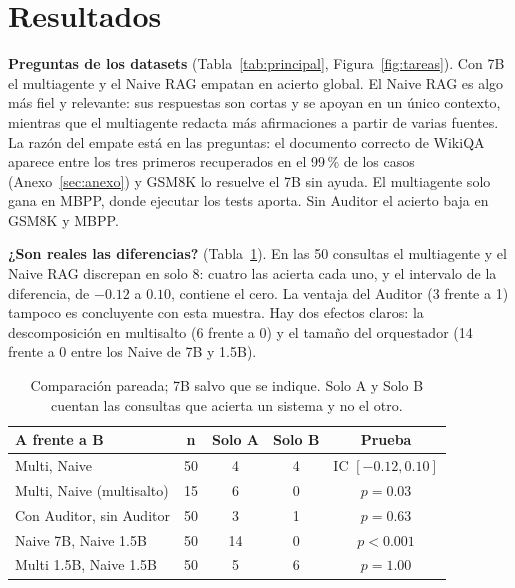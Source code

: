 \documentclass[10pt,a4paper,twocolumn]{article}
\begin{document}
\section{Resultados}

\textbf{Preguntas de los datasets} (Tabla~\ref{tab:principal}, Figura~\ref{fig:tareas}). Con 7B el multiagente y el Naive RAG empatan en acierto global. El Naive RAG es algo más fiel y relevante: sus respuestas son cortas y se apoyan en un único contexto, mientras que el multiagente redacta más afirmaciones a partir de varias fuentes. La razón del empate está en las preguntas: el documento correcto de WikiQA aparece entre los tres primeros recuperados en el 99\,\% de los casos (Anexo~\ref{sec:anexo}) y GSM8K lo resuelve el 7B sin ayuda. El multiagente solo gana en MBPP, donde ejecutar los tests aporta. Sin Auditor el acierto baja en GSM8K y MBPP.

\textbf{¿Son reales las diferencias?} (Tabla~\ref{tab:pares}). En las 50 consultas el multiagente y el Naive RAG discrepan en solo 8: cuatro las acierta cada uno, y el intervalo de la diferencia, de $-0.12$ a $0.10$, contiene el cero. La ventaja del Auditor (3 frente a 1) tampoco es concluyente con esta muestra. Hay dos efectos claros: la descomposición en multisalto (6 frente a 0) y el tamaño del orquestador (14 frente a 0 entre los Naive de 7B y 1.5B).

\begin{table}[t]
\centering
\caption{Comparación pareada; 7B salvo que se indique. Solo A y Solo B cuentan las consultas que acierta un sistema y no el otro.}
\label{tab:pares}
\footnotesize
\setlength{\tabcolsep}{3pt}
\begin{tabular}{lcccc}
\toprule
A frente a B & n & Solo A & Solo B & Prueba \\
\midrule
Multi, Naive & 50 & 4 & 4 & IC $[-0.12, 0.10]$ \\
Multi, Naive (multisalto) & 15 & 6 & 0 & $p = 0.03$ \\
Con Auditor, sin Auditor & 50 & 3 & 1 & $p = 0.63$ \\
Naive 7B, Naive 1.5B & 50 & 14 & 0 & $p < 0.001$ \\
Multi 1.5B, Naive 1.5B & 50 & 5 & 6 & $p = 1.00$ \\
\bottomrule
\end{tabular}
\end{table}
\end{document}
